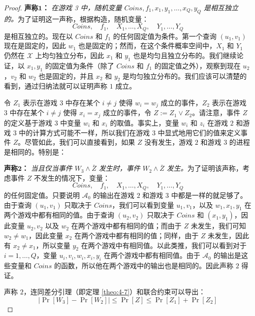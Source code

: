 \begin{proof}
\vspace{5pt}

\noindent
\textbf{声称$\mathbf{1}$：}
\emph{在游戏 3 中，随机变量 $Coins,f_1,x_1,y_1,\dots,x_Q,y_Q$ 是相互独立的。}为了证明这一声称，根据构造，随机变量：
\[
Coins,\quad
f_1,\quad
X_1,\dots,X_Q,\quad
Y_1,\dots,Y_Q
\]
是相互独立的。现在以 $Coins$ 和 $f_1$ 的任何固定值为条件。第一个查询 $(u_1,v_1)$ 现在是固定的，因此 $w_1$ 也是固定的；然而，在这个条件概率空间中，$X_1$ 和 $Y_1$ 仍然在 $\mathcal{X}$ 上均匀独立分布，因此 $x_1$ 和 $y_1$ 也是均匀且独立分布的。我们继续论证，以 $x_1,y_1$ 的固定值为条件（除了 $Coins$ 和 $f_1$ 的固定值之外），观察到现在 $u_2$，$v_2$ 和 $w_2$ 也是固定的，并且 $x_2$ 和 $y_2$ 是均匀独立分布的。我们应该可以清楚的看到，通过归纳法就可以证明声称 $1$ 成立。

令 $Z_1$ 表示在游戏 $3$ 中存在某个 $i\neq j$ 使得 $w_i=w_j$ 成立的事件，$Z_2$ 表示在游戏 $3$ 中存在某个 $i\neq j$ 使得 $x_i=x_j$ 成立的事件，令 $Z:=Z_1\lor Z_2$。请注意，事件 $Z$ 的定义基于游戏 $3$ 中变量 $w_i$ 和 $x_i$ 的取值。事实上，变量 $w_i$ 和 $z_i$ 在游戏 $2$ 和游戏 $3$ 中的计算方式可能不一样，所以我们在游戏 $3$ 中显式地用它们的值来定义事件 $Z$。尽管如此，我们可以直接看到，如果 $Z$ 没有发生，游戏 $2$ 和游戏 $3$ 的进程是相同的。特别是：

\vspace{5pt}

\noindent
\textbf{声称$\mathbf{2}$：}
\emph{当且仅当事件 $W_3\land\bar Z$ 发生时，事件 $W_2\land\bar Z$ 发生。}为了证明该声称，考虑事件 $Z$ 不发生的情况下，变量：
\[
Coins,\quad
f_1,\quad
X_1,\dots,X_Q,\quad
Y_1,\dots,Y_Q
\]
的任何固定值。只要说明 $\mathcal{A}_0$ 的输出在游戏 $2$ 和游戏 $3$ 中都是一样的就足够了。由于查询 $(u_1,v_1)$ 只取决于 $Coins$，我们可以看到变量 $u_1,v_1$，以及 $w_1,x_1,y_1$ 在两个游戏中都有相同的值。由于查询 $(u_2,v_2)$ 只取决于 $Coins$ 和 $(x_1,y_1)$，因此变量 $u_2,v_2$ 以及 $w_2$ 在两个游戏中都有相同的值；而由于 $Z$ 未发生，我们可知 $w_2\neq w_1$，因此变量 $x_2$ 在两个游戏中都有相同的值；同样，由于 $Z$ 未发生，因此有 $x_2\neq x_1$，所以变量 $y_2$ 在两个游戏中有相同值。以此类推，我们可以看到对于 $i=1,\dots,Q$，变量 $u_i,v_i,w_i,x_i,y_i$ 在两个游戏中都有相同值。由于 $\mathcal{A}_0$ 的输出是这些变量和 $Coins$ 的函数，所以他在两个游戏中的输出也是相同的。因此声称 $2$ 得证。

声称 $2$，连同差分引理（即定理 \ref{theo:4-7}）和联合约束可以导出：
\begin{equation}\label{eq:4-27}
|\Pr[W_3]-\Pr[W_2]|\leq\Pr[Z]\leq\Pr[Z_1]+\Pr[Z_2]
\end{equation}


\end{proof}
